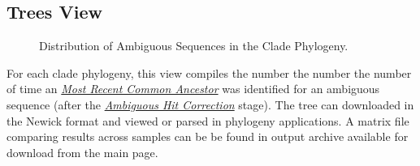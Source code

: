 \documentclass[letterpaper,10pt,english]{sphinxmanual}
\begin{document}
\subsection{Trees View}
\label{Web:trees-view}\begin{figure}[htbp]
\centering
\capstart

\caption{Distribution of Ambiguous Sequences in the Clade Phylogeny.}\end{figure}

For each clade phylogeny, this view compiles the number the number the
number of time an {\hyperref[defs:mrca]{\emph{Most Recent Common Ancestor}}} was identified for an ambiguous sequence
(after the {\hyperref[defs:multiple-hits]{\emph{Ambiguous Hit Correction}}} stage). The tree can downloaded in the
Newick format and viewed or parsed in phylogeny applications. A matrix
file comparing results across samples can be be found in output
archive available for download from the main page.
\end{document}
